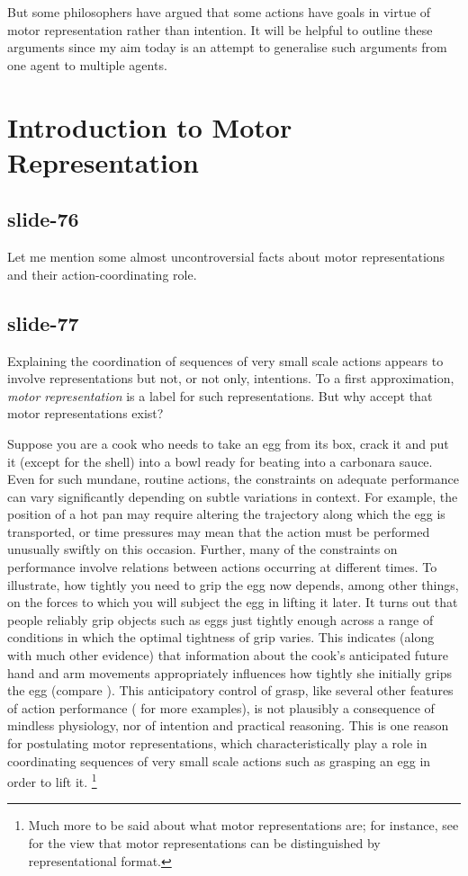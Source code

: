 \documentclass[12pt,\papersize]{extarticle}
\begin{document}
But some philosophers have argued that some actions have goals in virtue of motor
representation rather than intention.
It will be helpful to outline these arguments since my aim today is
an attempt to generalise such arguments from one agent to multiple agents.



\section{Introduction to Motor Representation}

\subsection{slide-76}
Let me mention some almost uncontroversial facts about motor representations and
their action-coordinating role.

\subsection{slide-77}
Explaining the coordination of
sequences of very small scale actions appears to involve representations but not, or not
only, intentions.  To a first approximation, \emph{motor representation} is a label for
such representations.  But why accept that motor representations exist?

Suppose you are a cook who needs to take an egg from its box, crack it and put it (except for the shell) into a bowl ready for beating into a carbonara sauce.
Even for such mundane, routine actions, the constraints on adequate performance can vary significantly depending on subtle variations in context. For example, the position of a hot pan may require altering the trajectory along which the egg is transported, or time pressures may mean that the action must be performed unusually swiftly on this occasion.
Further, many of the constraints on performance involve relations between actions occurring at different times.
To illustrate, how tightly you need to grip the egg now depends, among other things, on the forces to which you will subject the egg in lifting it later.
It turns out that people reliably grip objects such as eggs just tightly enough across a range of conditions in which the optimal tightness of grip varies.
This indicates (along with much other evidence) that information about the cook’s anticipated future hand and arm movements appropriately influences how tightly she initially grips the egg (compare \citealp{kawato:1999_internal}).
This anticipatory control of grasp,
like several other features of action performance (\citealp[see][chapter 1]{rosenbaum:2010_human} for more examples),
is not plausibly a consequence of mindless physiology, nor of intention and practical reasoning.
This is one reason for postulating motor representations, which characteristically play a role in coordinating sequences of very small scale actions such as grasping an egg in order to lift it.%
\footnote{%
Much more to be said about what motor representations are; for instance, see \citet{butterfill:2012_intention} for the view that motor representations can be distinguished by representational format.
}
\end{document}
